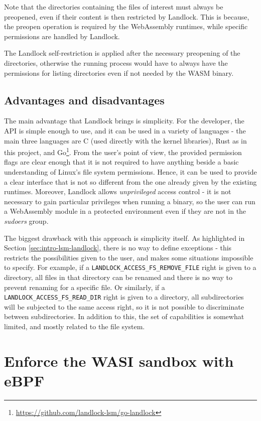 Note that the directories containing the files of interest must always be preopened,
even if their content is then restricted by Landlock. This is because, the preopen operation
is required by the WebAssembly runtimes, while specific permissions are handled by Landlock.

The Landlock self-restriction is applied after the necessary preopening of the directories,
otherwise the running process would have to always have the permissions for listing directories even if
not needed by the WASM binary.

\subsection{Advantages and disadvantages}

The main advantage that Landlock brings is simplicity. For the developer, the API is simple enough to use,
and it can be used in a variety of languages - the main three languages are C (used directly with the kernel libraries),
Rust as in this project, and Go\footnote{\url{https://github.com/landlock-lsm/go-landlock}}.
From the user's point of view, the provided permission flags are clear enough that it is not required to have
anything beside a basic understanding of Linux's file system permissions.
Hence, it can be used to provide a clear interface that is not so different from the one already given by
the existing runtimes.
Moreover, Landlock allows \textit{unprivileged} access control - it is not necessary to gain particular privileges
when running a binary, so the user can run a WebAssembly module in a protected environment even if they are not
in the \textit{sudoers} group.

The biggest drawback with this approach is simplicity itself. As highlighted in Section \ref{sec:intro-lsm-landlock},
there is no way to define exceptions - this restricts the possibilities given to the user, and makes some situations
impossible to specify. For example, if a \texttt{LANDLOCK\_ACCESS\_FS\_REMOVE\_FILE} right is given to a directory,
all files in that directory can be renamed and there is no way to prevent renaming for a specific file.
Or similarly, if a \texttt{LANDLOCK\_ACCESS\_FS\_READ\_DIR} right is given to a directory, all subdirectories
will be subjected to the same access right, so it is not possible to discriminate between subdirectories.
In addition to this, the set of capabilities is somewhat limited, and mostly related to the file system.

\section{Enforce the WASI sandbox with eBPF}

